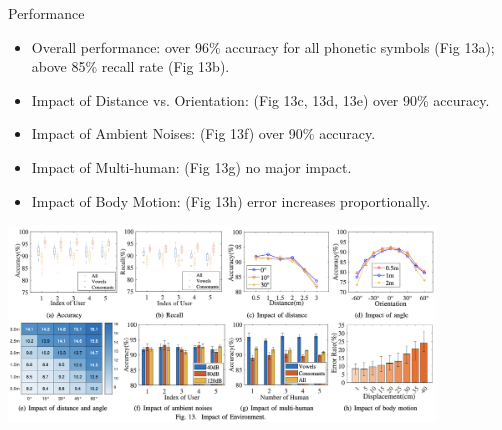 \documentclass[dvipsnames, handout]{beamer}
\newcommand{\1}{\mathds{1}}	%
\begin{document}
\begin{frame}[t]{Performance}
\begin{itemize}
\item Overall performance: over 96\% accuracy for all phonetic symbols (Fig 13a); above 85\% recall rate (Fig 13b).
\item Impact of Distance vs. Orientation: (Fig 13c, 13d, 13e) over 90\% accuracy.
\item Impact of Ambient Noises: (Fig 13f) over 90\% accuracy.
\item Impact of Multi-human: (Fig 13g) no major impact.
\item Impact of Body Motion: (Fig 13h) error increases proportionally. 
\end{itemize}

\begin{center}
\includegraphics[width=0.85\textwidth]{imgs/mmmic-fig13.png}
\end{center}


\end{frame}









\end{document}

